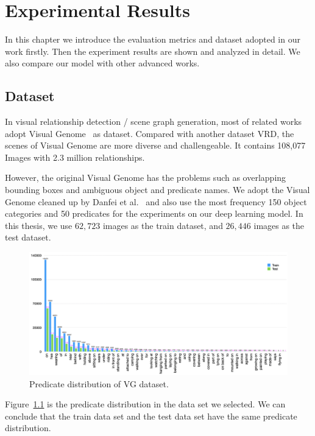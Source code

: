\chapter{Experimental Results}
\label{chap:experiment}
In this chapter we introduce the evaluation metrics and dataset adopted in our work firstly. Then the experiment results are shown and analyzed in detail. We also compare our model with other advanced works.

\section{Dataset}

In visual relationship detection / scene graph generation, most of related works adopt Visual Genome~\cite{krishna2017visual} as dataset. Compared with another dataset VRD, the scenes of Visual Genome are more diverse and challengeable. It contains 108,077 Images with 2.3 million relationships.

However, the original Visual Genome has the problems such as overlapping bounding boxes and ambiguous object and predicate names. We adopt the Visual Genome cleaned up by Danfei et al.~\cite{xu2017scene}  and also use the most frequency 150 object categories and 50 predicates for the experiments on our deep learning model. In this thesis, we use $ 62,723 $ images as the train dataset, and $ 26,446 $ images as the test dataset.

\begin{figure}[!hbtp]
	\centering
	\includegraphics[width=0.9\linewidth]{figures/predicates}
	\caption[Predicate distribution of VG dataset]{Predicate distribution of VG dataset.}
	\label{fig:predicates}
\end{figure}

Figure~\ref{fig:predicates} is the predicate distribution in the data set we selected. We can conclude that the train data set and the test data set have the same predicate distribution.

